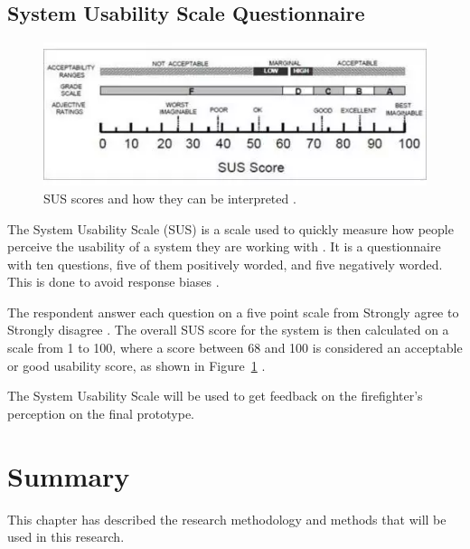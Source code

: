 \documentclass[../Main/thesis.tex]{subfiles}
\begin{document}
\subsection{System Usability Scale Questionnaire}
\begin{figure}[h]
	\centering
	\includegraphics[width=\textwidth]{../fig/sus-score}
	\caption[SUS scores and how they can be interpreted]{SUS scores and how they can be interpreted \citep{Brooke2013}.}
	\label{fig:sus-score}
\end{figure}

The System Usability Scale (SUS) is a scale used to quickly measure how people perceive the usability of a system they are working with \citep{Brooke2013}.
It is a questionnaire with ten questions, five of them positively worded, and five negatively worded.
This is done to avoid response biases \citep{Brooke2013}.

The respondent answer each question on a five point scale from Strongly agree to Strongly disagree \citep{AssistantSecretaryforPublicAffairs2013}.
The overall SUS score for the system is then calculated on a scale from 1 to 100, where a score between 68 and 100 is considered an acceptable or good usability score, as shown in Figure~\ref{fig:sus-score} \citep{AssistantSecretaryforPublicAffairs2013}.

The System Usability Scale will be used to get feedback on the firefighter's perception on the final prototype.


\section{Summary}
This chapter has described the research methodology and methods that will be used in this research. 

\blankpage


\onlyinsubfile{}
\onlyinsubfile{}
\end{document}
